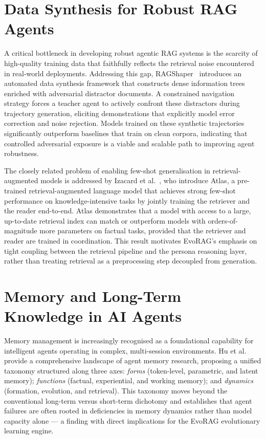 \section{Data Synthesis for Robust RAG Agents}
 
A critical bottleneck in developing robust agentic RAG systems is the scarcity of
high-quality training data that faithfully reflects the retrieval noise encountered in
real-world deployments.
Addressing this gap, RAGShaper~\cite{anonymous2026ragshaper} introduces an automated
data synthesis framework that constructs dense information trees enriched with
adversarial distractor documents.
A constrained navigation strategy forces a teacher agent to actively confront these
distractors during trajectory generation, eliciting demonstrations that explicitly
model error correction and noise rejection.
Models trained on these synthetic trajectories significantly outperform baselines that
train on clean corpora, indicating that controlled adversarial exposure is a viable and
scalable path to improving agent robustness.

The closely related problem of enabling few-shot generalisation in retrieval-augmented
models is addressed by Izacard et al.~\cite{izacard2022atlas}, who introduce Atlas,
a pre-trained retrieval-augmented language model that achieves strong few-shot
performance on knowledge-intensive tasks by jointly training the retriever and the
reader end-to-end.
Atlas demonstrates that a model with access to a large, up-to-date retrieval index
can match or outperform models with orders-of-magnitude more parameters on factual
tasks, provided that the retriever and reader are trained in coordination.
This result motivates EvoRAG's emphasis on tight coupling between the retrieval
pipeline and the persona reasoning layer, rather than treating retrieval as a
preprocessing step decoupled from generation.
 
\section{Memory and Long-Term Knowledge in AI Agents}
 
Memory management is increasingly recognised as a foundational capability for
intelligent agents operating in complex, multi-session environments.
Hu et al.~\cite{hu2025memory} provide a comprehensive landscape of agent memory
research, proposing a unified taxonomy structured along three axes:
\emph{forms} (token-level, parametric, and latent memory);
\emph{functions} (factual, experiential, and working memory); and
\emph{dynamics} (formation, evolution, and retrieval).
This taxonomy moves beyond the conventional long-term versus short-term dichotomy and
establishes that agent failures are often rooted in deficiencies in memory dynamics
rather than model capacity alone — a finding with direct implications for the EvoRAG
evolutionary learning engine.
 
